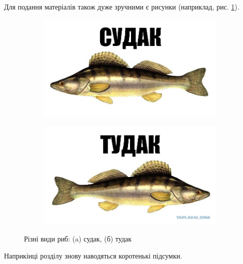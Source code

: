 Для подання матеріалів також дуже зручними є рисунки (наприклад, рис.
\ref{fig_sudak}).


\begin{figure}[ht]
\centering
    \begin{subfigure}[b]{0.5\textwidth}    
        \includegraphics[scale=0.3]{Images/Sudak.png}
        \caption{}
    \end{subfigure}%
    \begin{subfigure}[b]{0.5\textwidth}
        \includegraphics[scale=0.3]{Images/Tudak.png}
        \caption{}
    \end{subfigure}
 
    \caption{Різні види риб: (a) судак, (б) тудак}
    \label{fig_sudak}
\end{figure}

\chapconclude

Наприкінці розділу знову наводяться коротенькі підсумки.
